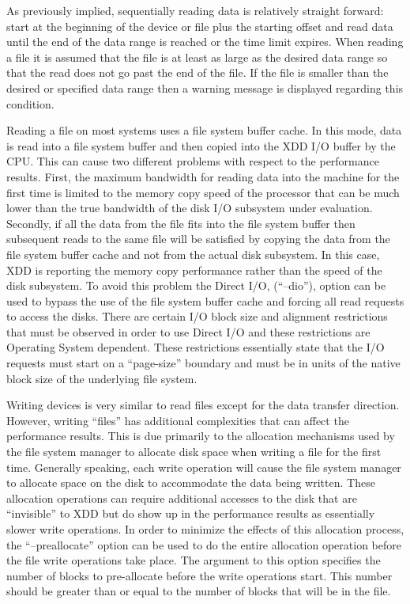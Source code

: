 As previously implied, sequentially reading data is relatively straight forward: start at the beginning of the device or file plus the starting offset and read data until the end of the data range is reached or the time limit expires. When reading a file it is assumed that the file is at least as large as the desired data range so that the read does not go past the end of the file. If the file is smaller than the desired or specified data range then a warning message is displayed regarding this condition.

Reading a file on most systems uses a file system buffer cache. In this mode, data is read into a file system buffer and then copied into the XDD I/O buffer by the CPU. This can cause two different problems with respect to the performance results. First, the maximum bandwidth for reading data into the machine for the first time is limited to the memory copy speed of the processor that can be much lower than the true bandwidth of the disk I/O subsystem under evaluation. Secondly, if all the data from the file fits into the file system buffer then subsequent reads to the same file will be satisfied by copying the data from the file system buffer cache and not from the actual disk subsystem. In this case, XDD is reporting the memory copy performance rather than the speed of the disk subsystem. To avoid this problem the Direct I/O, (``--dio''), option can be used to bypass the use of the file system buffer cache and forcing all read requests to access the disks. There are certain I/O block size and alignment restrictions that must be observed in order to use Direct I/O and these restrictions are Operating System dependent. These restrictions essentially state that the I/O requests must start on a ``page-size'' boundary and must be in units of the native block size of the underlying file system.

Writing devices is very similar to read files except for the data transfer direction. However, writing ``files'' has additional complexities that can affect the performance results. This is due primarily to the allocation mechanisms used by the file system manager to allocate disk space when writing a file for the first time. Generally speaking, each write operation will cause the file system manager to allocate space on the disk to accommodate the data being written. These allocation operations can require additional accesses to the disk that are ``invisible'' to XDD but do show up in the performance results as essentially slower write operations. In order to minimize the effects of this allocation process, the ``--preallocate'' option can be used to do the entire allocation operation before the file write operations take place. The argument to this option specifies the number of blocks to pre-allocate before the write operations start. This number should be greater than or equal to the number of blocks that will be in the file.

